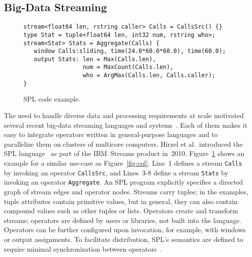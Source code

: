 \subsection{Big-Data Streaming}\label{sec:big} %

\begin{figure}[!h]
\begin{lstlisting}[xleftmargin=2mm,morekeywords={stream,float64,rstring,type,int32,window,output,tuple}]
stream<float64 len, rstring caller> Calls = CallsSrc() {}
type Stat = tuple<float64 len, int32 num, rstring who>;
stream<Stat> Stats = Aggregate(Calls) {
   window Calls:sliding, time(24.0*60.0*60.0), time(60.0);
   output Stats: len = Max(Calls.len),
                 num = MaxCount(Calls.len),
                 who = ArgMax(Calls.len, Calls.caller);
}
\end{lstlisting}
\vspace*{-4mm}
\caption{\label{fig:spl}SPL code example.}
\end{figure}

The need to handle diverse data and processing requirements at scale
motivated several recent big-data streaming languages and
systems~\cite{akidau_et_al_2013,akidau_et_al_2015,carbone_et_al_2015,chandramouli_goldstein_maier_2010,hirzel_schneider_gedik_2017,murray_et_al_2013,toshniwal_et_al_2014,zaharia_et_al_2013}.
Each of them makes it easy to integrate operators written in
general-purpose languages and to parallelize them on clusters of
multicore computers. Hirzel et al.\ introduced the \textsf{SPL}
language~\cite{hirzel_schneider_gedik_2017} as part of the \textsf{IBM~Streams}
product in~2010. Figure~\ref{fig:spl} shows an example for a similar
use-case as Figure~\ref{fig:cql}. Line~1 defines a stream
\lstinline{Calls} by invoking an operator \lstinline{CallsSrc}, and
\mbox{Lines 3-8} define a stream \lstinline{Stats} by invoking an
operator \lstinline{Aggregate}. An SPL program explicitly specifies a
directed graph of stream edges and operator nodes. Streams carry
tuples; in the examples, tuple attributes contain primitive values,
but in general, they can also contain compound values such as other
tuples or lists.  Operators create and transform streams; operators
are defined by users or libraries, not built into the
language. Operators can be further configured upon invocation, for
example, with windows or output assignments. To facilitate
distribution, SPL's semantics are defined to require minimal
synchronization between operators~\cite{soule_et_al_2016}.

